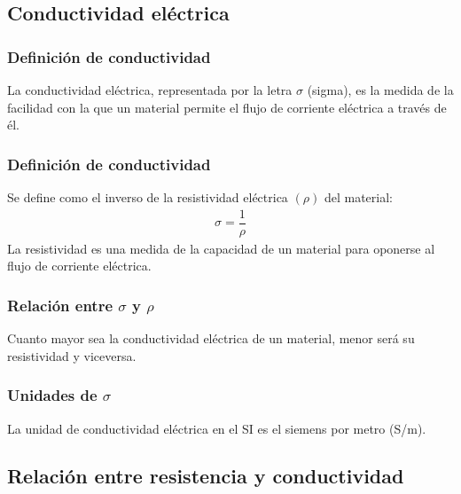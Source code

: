 \documentclass[14pt]{beamer}
\begin{document}
\subsection{Conductividad eléctrica}

\begin{frame}
\frametitle{Definición de conductividad}
La conductividad eléctrica, representada por la letra $\sigma$ (sigma), \pause es la medida de la facilidad con la que un material permite el flujo de corriente eléctrica a través de él.
\end{frame}
\begin{frame}
\frametitle{Definición de conductividad}
Se define como el inverso de la resistividad eléctrica $(\rho)$ del material:
\pause
\begin{align*}
\sigma = \dfrac{1}{\rho}
\end{align*}
\pause
La resistividad es una medida de la capacidad de un material para oponerse al flujo de corriente eléctrica.
\end{frame}
\begin{frame}
\frametitle{Relación entre $\sigma$ y $\rho$}
Cuanto mayor sea la conductividad eléctrica de un material, menor será su resistividad y viceversa.
\end{frame}
\begin{frame}
\frametitle{Unidades de $\sigma$}
La unidad de conductividad eléctrica en el SI es el siemens por metro (S/m).
\end{frame}

\subsection{Relación entre resistencia y conductividad}
\end{document}
